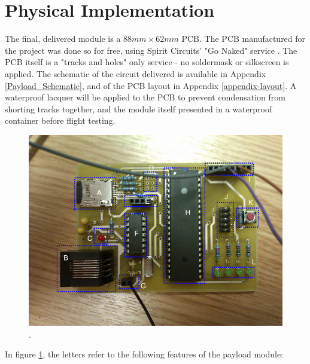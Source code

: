 \section{Physical Implementation}
\label{sec:PCB-implementation}

The final, delivered module is a $88mm\times62mm$ PCB. The PCB manufactured 
for the project was done so for free, using Spirit Circuits' "Go Naked"
service \cite{go-naked}. The PCB itself is a "tracks and holes" only service 
- no soldermask or silkscreen is applied. The schematic of the circuit 
delivered is available in Appendix \ref{Payload_Schematic}, and of the PCB layout in Appendix 
\ref{appendix-layout}. A waterproof lacquer will be applied to the PCB to prevent condensation 
from shorting tracks together, and the module itself presented in a 
waterproof container before flight testing.

\begin{figure}[H]
        \centering
        \includegraphics[width=1.00\textwidth]{figures/PayloadImplementation.png}
        . 
        \label{fig:PayloadImplementation}
\end{figure}

In figure \ref{fig:PayloadImplementation}, the letters refer to the following 
features of the payload module:

